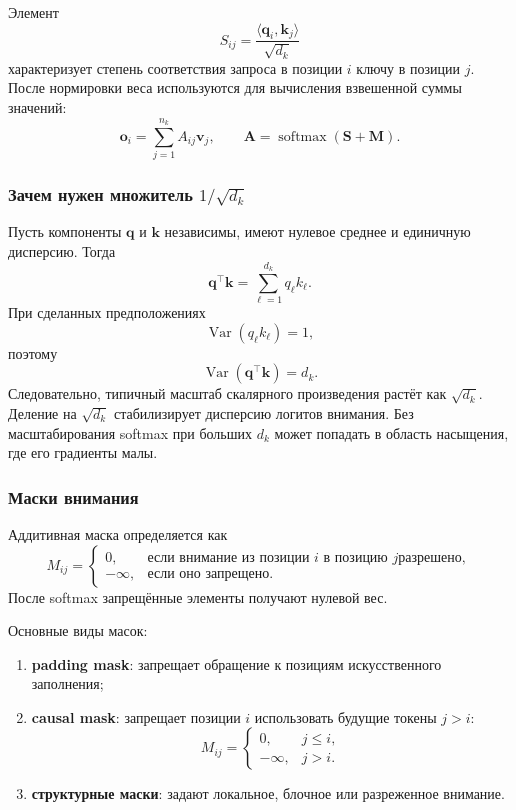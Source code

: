 \documentclass[12pt,a4paper]{article}
\theoremstyle{definition}
\newcommand{\softmax}{\operatorname{softmax}}
\newcommand{\Var}{\operatorname{Var}}
\newcommand{\1}{\mathbf{1}}
\begin{document}
Элемент
\[
    S_{ij}=\frac{\langle \bm{q}_i,\bm{k}_j\rangle}{\sqrt{d_k}}
\]
характеризует степень соответствия запроса в позиции $i$ ключу в
позиции $j$. После нормировки веса используются для вычисления
взвешенной суммы значений:
\[
    \bm{o}_i=\sum_{j=1}^{n_k}A_{ij}\bm{v}_j,
    \qquad
    \bm{A}=\softmax(\bm{S}+\bm{M}).
\]

\subsubsection{Зачем нужен множитель \(1/\sqrt{d_k}\)}

Пусть компоненты $\bm{q}$ и $\bm{k}$ независимы, имеют нулевое среднее
и единичную дисперсию. Тогда
\[
    \bm{q}^{\top}\bm{k}
    =
    \sum_{\ell=1}^{d_k}q_\ell k_\ell.
\]
При сделанных предположениях
\[
    \Var(q_\ell k_\ell)=1,
\]
поэтому
\[
    \Var(\bm{q}^{\top}\bm{k})=d_k.
\]
Следовательно, типичный масштаб скалярного произведения растёт как
$\sqrt{d_k}$. Деление на $\sqrt{d_k}$ стабилизирует дисперсию логитов
внимания. Без масштабирования softmax при больших $d_k$ может попадать
в область насыщения, где его градиенты малы.

\subsubsection{Маски внимания}

Аддитивная маска определяется как
\[
    M_{ij}
    =
    \begin{cases}
        0, & \text{если внимание из позиции \(i\) в позицию \(j\)
        разрешено},\\
        -\infty, & \text{если оно запрещено}.
    \end{cases}
\]
После softmax запрещённые элементы получают нулевой вес.

Основные виды масок:
\begin{enumerate}
    \item \textbf{padding mask}: запрещает обращение к позициям
    искусственного заполнения;
    \item \textbf{causal mask}: запрещает позиции $i$ использовать
    будущие токены $j>i$:
    \[
        M_{ij}
        =
        \begin{cases}
            0, & j\leq i,\\
            -\infty, & j>i.
        \end{cases}
    \]
    \item \textbf{структурные маски}: задают локальное, блочное или
    разреженное внимание.
\end{enumerate}
\end{document}
